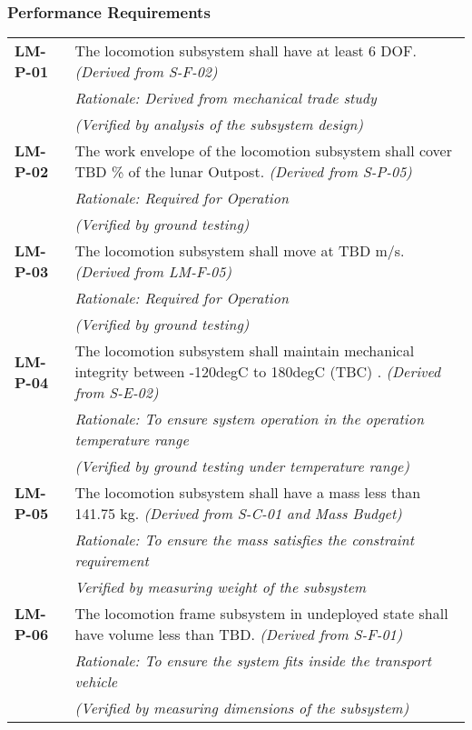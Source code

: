\vspace{-15pt}
\subsubsection*{Performance Requirements}
\vspace{-15pt}
\begin{longtable}{P{2cm}P{13.75cm}}
\textbf{LM-P-01}	&
The locomotion subsystem shall have at least 6 \gls{DOF}.
\textit{(Derived from S-F-02)}	\\
& \textit{Rationale: Derived from mechanical trade study}	\\
& \textit{(Verified by analysis of the subsystem design)}	\\

\textbf{LM-P-02}	&
The work envelope of the locomotion subsystem shall cover \gls{TBD} \% of the lunar Outpost.
\textit{(Derived from S-P-05)} \\
&	\textit{Rationale: Required for Operation} \\
& \textit{(Verified by ground testing)}	\\

\textbf{LM-P-03}	&
The locomotion subsystem shall move at \gls{TBD} \gls{m/s}.
\textit{(Derived from LM-F-05)}	\\
& \textit{Rationale: Required for Operation} \\
& \textit{(Verified by ground testing)}	\\

\textbf{LM-P-04}	&
The locomotion subsystem shall maintain mechanical integrity between -120\gls{degC} to 180\gls{degC} (\gls{TBC}) \cite{ERAjoint}.
\textit{(Derived from S-E-02)}	\\
& \textit{Rationale: To ensure system operation in the operation temperature range} \\
& \textit{(Verified by ground testing under temperature range)}	\\

\textbf{LM-P-05}	&
The locomotion subsystem shall have a mass less than 141.75 \gls{kg}.
\textit{(Derived from S-C-01 and Mass Budget)}	\\
& \textit{Rationale: To ensure the mass satisfies the constraint requirement} \\
& \textit{Verified by measuring weight of the subsystem}	\\

\textbf{LM-P-06}	&
The locomotion frame subsystem in undeployed state shall have volume less than \gls{TBD}.
\textit{(Derived from S-F-01)}	\\
& \textit{Rationale: To ensure the system fits inside the transport vehicle} \\
& \textit{(Verified by measuring dimensions of the subsystem)}	\\


\end{longtable}
